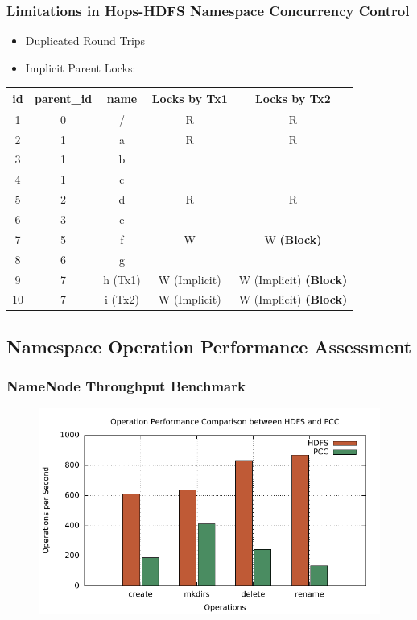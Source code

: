 \documentclass{beamer}
\begin{document}
\begin{frame}
	\frametitle{Limitations in Hops-HDFS Namespace Concurrency Control}
		\begin{itemize}
			\item Duplicated Round Trips
			\item Implicit Parent Locks:
		\end{itemize}
\begin{table}[h]
	\centering
	\begin{tabular}{|c|c|c|c|c|}
		\hline
		\textbf{id} & \textbf{parent\_id} & \textbf{name} & \textbf{Locks by Tx1} & \textbf{Locks by Tx2} \\ \hline
		1 & 0 & / & R & R \\ \hline
		2 & 1 & a & R & R \\ \hline
		3 & 1 & b & ~ & ~ \\ \hline
		4 & 1 & c & ~ & ~ \\ \hline
		5 & 2 & d & R & R\\ \hline
		6 & 3 & e & ~ & ~ \\ \hline
		7 & 5 & f  & W & W \textbf{(Block)} \\ \hline
		8 & 6 & g & ~ & ~ \\ \hline
		9 & 7 & h (Tx1) & W (Implicit) & W (Implicit) \textbf{(Block)}\\ \hline
		10 & 7 & i (Tx2) & W (Implicit) & W (Implicit)  \textbf{(Block)}\\ \hline
	\end{tabular}
\end{table}
\end{frame}

\subsection{Namespace Operation Performance Assessment}
\begin{frame}
	\frametitle{NameNode Throughput Benchmark}
	\begin{figure}[h]
		\centering
		\includegraphics[width=\linewidth]{figs/nn_100.pdf}
	\end{figure}
\end{frame}
\end{document}
